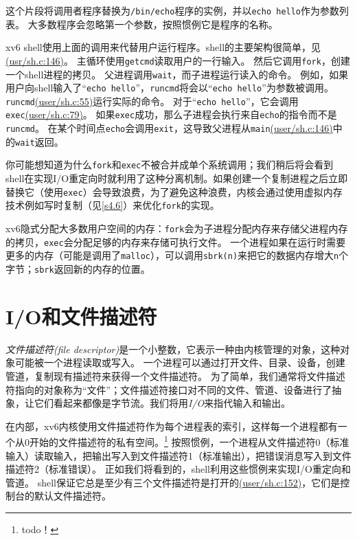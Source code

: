 这个片段将调用者程序替换为\texttt{/bin/echo}程序的实例，并以\texttt{echo hello}作为参数列表。
大多数程序会忽略第一个参数，按照惯例它是程序的名称。

xv6 shell使用上面的调用来代替用户运行程序。shell的主要架构很简单，见\href{https://github.com/mit-pdos/xv6-riscv/blob/riscv//user/sh.c#L146}{(usr/sh.c:146)}。
主循环使用\texttt{getcmd}读取用户的一行输入。
然后它调用\texttt{fork}，创建一个shell进程的拷贝。
父进程调用\texttt{wait}，而子进程运行读入的命令。
例如，如果用户向shell输入了“\texttt{echo hello}”，\texttt{runcmd}将会以“\texttt{echo hello}”为参数被调用。
\texttt{runcmd}\href{https://github.com/mit-pdos/xv6-riscv/blob/riscv//user/sh.c#L55}{(user/sh.c:55)}运行实际的命令。
对于“\texttt{echo hello}”，它会调用\texttt{exec}\href{https://github.com/mit-pdos/xv6-riscv/blob/riscv//user/sh.c#L79}{(user/sh.c:79)}。
如果\texttt{exec}成功，那么子进程会执行来自\texttt{echo}的指令而不是\texttt{runcmd}。
在某个时间点\texttt{echo}会调用\texttt{exit}，这导致父进程从\texttt{main}\href{https://github.com/mit-pdos/xv6-riscv/blob/riscv//user/sh.c#L146}{(user/sh.c:146)}中的\texttt{wait}返回。

你可能想知道为什么\texttt{fork}和\texttt{exec}不被合并成单个系统调用；我们稍后将会看到shell在实现I/O重定向时就利用了这种分离机制。如果创建一个复制进程之后立即替换它（使用\texttt{exec}）会导致浪费，为了避免这种浪费，内核会通过使用虚拟内存技术例如写时复制（见\autoref{s4.6}）来优化\texttt{fork}的实现。

xv6隐式分配大多数用户空间的内存：\texttt{fork}会为子进程分配内存来存储父进程内存的拷贝，\texttt{exec}会分配足够的内存来存储可执行文件。
一个进程如果在运行时需要更多的内存（可能是调用了\texttt{malloc}），可以调用\texttt{sbrk(n)}来把它的数据内存增大\texttt{n}个字节；\texttt{sbrk}返回新的内存的位置。

\section{I/O和文件描述符}

\emph{文件描述符(file descriptor)}是一个小整数，它表示一种由内核管理的对象，这种对象可能被一个进程读取或写入。
一个进程可以通过打开文件、目录、设备，创建管道，复制现有描述符来获得一个文件描述符。
为了简单，我们通常将文件描述符指向的对象称为“文件”；文件描述符接口对不同的文件、管道、设备进行了抽象，让它们看起来都像是字节流。我们将用\emph{I/O}来指代输入和输出。

在内部，xv6内核使用文件描述符作为每个进程表的索引，这样每一个进程都有一个从0开始的文件描述符的私有空间。\footnote{todo！}
按照惯例，一个进程从文件描述符0（标准输入）读取输入，把输出写入到文件描述符1（标准输出），把错误消息写入到文件描述符2（标准错误）。
正如我们将看到的，shell利用这些惯例来实现I/O重定向和管道。
shell保证它总是至少有三个文件描述符是打开的\href{https://github.com/mit-pdos/xv6-riscv/blob/riscv//user/sh.c#L152}{(user/sh.c:152)}，它们是控制台的默认文件描述符。

